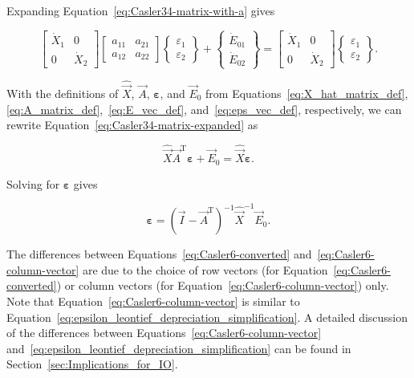 \noindent{}Expanding Equation~\ref{eq:Casler34-matrix-with-a} gives

\begin{equation} \label{eq:Casler34-matrix-expanded}
	\begin{bmatrix}
		\dot{X}_{1} & 0 \\
		0           & \dot{X}_{2}
	\end{bmatrix}
	\begin{bmatrix}
		a_{11} & a_{21} \\
		a_{12} & a_{22}
	\end{bmatrix}
	\begin{Bmatrix}
		\varepsilon_{1} \\
		\varepsilon_{2}
	\end{Bmatrix}
	+
	\begin{Bmatrix}
		\dot{E}_{01} \\
		\dot{E}_{02}
	\end{Bmatrix}
	=
	\begin{bmatrix}
		\dot{X}_{1} & 0 \\
		0           & \dot{X}_{2}
	\end{bmatrix}
	\begin{Bmatrix}
		\varepsilon_{1} \\
		\varepsilon_{2}
	\end{Bmatrix}.
\end{equation}

\noindent{}With the definitions of $\hat{\vec{X}}$,
$\vec{A}$, $\bm{\varepsilon}$, and $\vec{E}_{0}$
from Equations~\ref{eq:X_hat_matrix_def},
\ref{eq:A_matrix_def},~\ref{eq:E_vec_def}, 
and~\ref{eq:eps_vec_def}, respectively,
we can rewrite Equation~\ref{eq:Casler34-matrix-expanded} as

\begin{equation}
	\hat{\vec{X}} \vec{A}^{\mathrm{T}} \bm{\varepsilon}
	+ \vec{E}_{0}
	= \hat{\vec{X}} \bm{\varepsilon}.
\end{equation}

\noindent{}Solving for $\bm{\varepsilon}$ gives

\begin{equation} \label{eq:Casler6-column-vector}
	\bm{\varepsilon}
	= {(\vec{I} - \vec{A}^{\mathrm{T}})}^{-1} 
		\hat{\vec{X}}^{-1} 
		\vec{E}_{0}.
\end{equation}

The differences between Equations~\ref{eq:Casler6-converted}
and~\ref{eq:Casler6-column-vector} are due to the choice 
of row vectors (for Equation~\ref{eq:Casler6-converted})
or column vectors (for Equation~\ref{eq:Casler6-column-vector}) only.
Note that Equation~\ref{eq:Casler6-column-vector} is similar
to Equation~\ref{eq:epsilon_leontief_depreciation_simplification}.
A detailed discussion of the differences 
between Equations~\ref{eq:Casler6-column-vector} and~\ref{eq:epsilon_leontief_depreciation_simplification}
can be found in Section~\ref{sec:Implications_for_IO}.


